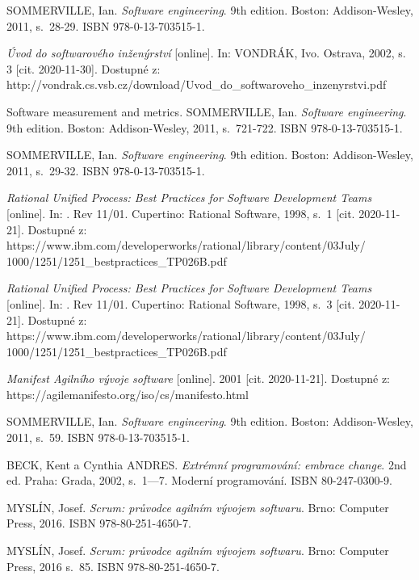 \documentclass[czech,master,public,dept460,male,cpdeclaration,oneside]{diploma}
\begin{document}
\begin{thebibliography}{37}

SOMMERVILLE, Ian. \textit{Software engineering}. 9th edition. Boston: Addison-Wesley, 2011, s.~28-29. ISBN 978-0-13-703515-1.

\textit{Úvod do softwarového inženýrství} [online]. In: VONDRÁK, Ivo. Ostrava, 2002, s. 3 [cit. 2020-11-30]. Dostupné z: http://vondrak.cs.vsb.cz/download/Uvod\_do\_softwaroveho\_inzenyrstvi.pdf

Software measurement and metrics. SOMMERVILLE, Ian. \textit{Software engineering}. 9th edition. Boston: Addison-Wesley, 2011, s.~721-722. ISBN 978-0-13-703515-1.

SOMMERVILLE, Ian. \textit{Software engineering}. 9th edition. Boston: Addison-Wesley, 2011, s.~29-32. ISBN 978-0-13-703515-1.

\textit{Rational Unified Process: Best Practices for Software Development Teams} [online]. In: . Rev 11/01. Cupertino: Rational Software, 1998, s.~1 [cit. 2020-11-21]. Dostupné z: https://www.ibm.com/developerworks/rational/library/content/03July/
1000/1251/1251\_bestpractices\_TP026B.pdf

\textit{Rational Unified Process: Best Practices for Software Development Teams} [online]. In: . Rev 11/01. Cupertino: Rational Software, 1998, s.~3 [cit. 2020-11-21]. Dostupné z: https://www.ibm.com/developerworks/rational/library/content/03July/
1000/1251/1251\_bestpractices\_TP026B.pdf

\textit{Manifest Agilního vývoje software} [online]. 2001 [cit. 2020-11-21]. Dostupné z: https://agilemanifesto.org/iso/cs/manifesto.html

SOMMERVILLE, Ian. \textit{Software engineering}. 9th edition. Boston: Addison-Wesley, 2011, s.~59. ISBN 978-0-13-703515-1.

BECK, Kent a Cynthia ANDRES. \textit{Extrémní programování: embrace change}. 2nd ed. Praha: Grada, 2002, s.~1---7. Moderní programování. ISBN 80-247-0300-9.

MYSLÍN, Josef. \textit{Scrum: průvodce agilním vývojem softwaru}. Brno: Computer Press, 2016. ISBN 978-80-251-4650-7.

MYSLÍN, Josef. \textit{Scrum: průvodce agilním vývojem softwaru}. Brno: Computer Press, 2016 s.~85. ISBN 978-80-251-4650-7.


\end{thebibliography}
\end{document}
